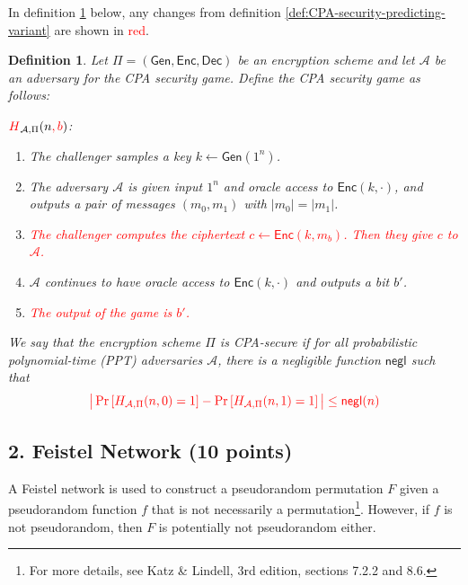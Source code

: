 \documentclass[11pt]{article}
\newcommand{\Gen}{\mathsf{Gen}}
\newcommand{\Enc}{\mathsf{Enc}}
\newcommand{\Dec}{\mathsf{Dec}}
\newcommand{\A}{\mathcal{A}}
\newcommand{\negl}{\mathsf{negl}}
\newtheorem{definition}[theorem]{Definition}
\numberwithin{equation}{section}
\begin{document}
In definition \ref{def:CPA-security-distinguishing-variant} below, any changes from definition \ref{def:CPA-security-predicting-variant} are shown in \textcolor{red}{red}.
\begin{definition}\label{def:CPA-security-distinguishing-variant}
Let $\Pi = (\Gen, \Enc, \Dec)$ be an encryption scheme and let $\A$ be an adversary for the CPA security game. Define the CPA security game as follows:\newline

\noindent\underline{$\textcolor{red}{H}_{\A, \Pi}(n\textcolor{red}{, b})$}:
\begin{enumerate}
    \item The challenger samples a key $k \leftarrow \Gen(1^n)$.
    \item The adversary $\A$ is given input $1^n$ and oracle access to $\Enc(k, \cdot)$, and outputs a pair of messages $(m_0, m_1)$ with $|m_0| = |m_1|$.
    \item \textcolor{red}{The challenger computes the ciphertext $c \leftarrow \Enc(k, m_b)$. Then they give $c$ to $\A$.}
    \item $\A$ continues to have oracle access to $\Enc(k, \cdot)$ and outputs a bit $b'$.
    \item \textcolor{red}{The output of the game is $b'$.}
\end{enumerate}

We say that the encryption scheme $\Pi$ is CPA-secure if for all probabilistic polynomial-time (PPT) adversaries $\A$, there is a negligible function $\negl$ such that
\[\textcolor{red}{\big|\Pr\left[H_{\A, \Pi}(n, 0) = 1\right] - \Pr\left[H_{\A, \Pi}(n, 1) = 1\right]\big| \leq \negl(n)}\]
\end{definition}

\pagebreak

\subsection*{2. Feistel Network (10 points)}

A Feistel network is used to construct a pseudorandom permutation $F$ given a pseudorandom function $f$ that is not necessarily a permutation\footnote{For more details, see Katz \& Lindell, 3rd edition, sections 7.2.2 and 8.6.}. However, if $f$ is not pseudorandom, then $F$ is potentially not pseudorandom either.
\end{document}
